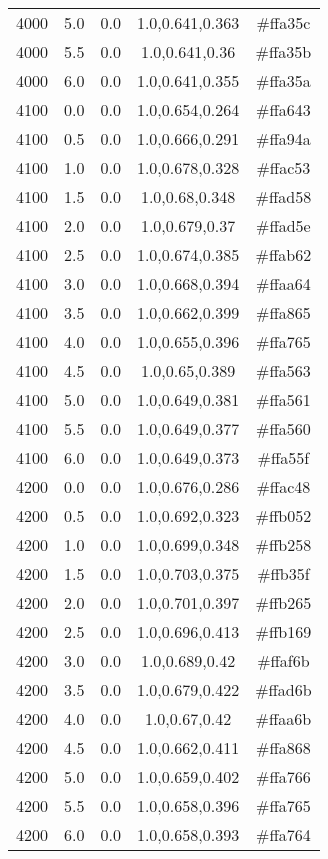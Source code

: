 \begin{tabular}{ccccc}
4000 & 5.0 & 0.0 & 1.0,0.641,0.363 & \#ffa35c \\ 
4000 & 5.5 & 0.0 & 1.0,0.641,0.36 & \#ffa35b \\ 
4000 & 6.0 & 0.0 & 1.0,0.641,0.355 & \#ffa35a \\ 
4100 & 0.0 & 0.0 & 1.0,0.654,0.264 & \#ffa643 \\ 
4100 & 0.5 & 0.0 & 1.0,0.666,0.291 & \#ffa94a \\ 
4100 & 1.0 & 0.0 & 1.0,0.678,0.328 & \#ffac53 \\ 
4100 & 1.5 & 0.0 & 1.0,0.68,0.348 & \#ffad58 \\ 
4100 & 2.0 & 0.0 & 1.0,0.679,0.37 & \#ffad5e \\ 
4100 & 2.5 & 0.0 & 1.0,0.674,0.385 & \#ffab62 \\ 
4100 & 3.0 & 0.0 & 1.0,0.668,0.394 & \#ffaa64 \\ 
4100 & 3.5 & 0.0 & 1.0,0.662,0.399 & \#ffa865 \\ 
4100 & 4.0 & 0.0 & 1.0,0.655,0.396 & \#ffa765 \\ 
4100 & 4.5 & 0.0 & 1.0,0.65,0.389 & \#ffa563 \\ 
4100 & 5.0 & 0.0 & 1.0,0.649,0.381 & \#ffa561 \\ 
4100 & 5.5 & 0.0 & 1.0,0.649,0.377 & \#ffa560 \\ 
4100 & 6.0 & 0.0 & 1.0,0.649,0.373 & \#ffa55f \\ 
4200 & 0.0 & 0.0 & 1.0,0.676,0.286 & \#ffac48 \\ 
4200 & 0.5 & 0.0 & 1.0,0.692,0.323 & \#ffb052 \\ 
4200 & 1.0 & 0.0 & 1.0,0.699,0.348 & \#ffb258 \\ 
4200 & 1.5 & 0.0 & 1.0,0.703,0.375 & \#ffb35f \\ 
4200 & 2.0 & 0.0 & 1.0,0.701,0.397 & \#ffb265 \\ 
4200 & 2.5 & 0.0 & 1.0,0.696,0.413 & \#ffb169 \\ 
4200 & 3.0 & 0.0 & 1.0,0.689,0.42 & \#ffaf6b \\ 
4200 & 3.5 & 0.0 & 1.0,0.679,0.422 & \#ffad6b \\ 
4200 & 4.0 & 0.0 & 1.0,0.67,0.42 & \#ffaa6b \\ 
4200 & 4.5 & 0.0 & 1.0,0.662,0.411 & \#ffa868 \\ 
4200 & 5.0 & 0.0 & 1.0,0.659,0.402 & \#ffa766 \\ 
4200 & 5.5 & 0.0 & 1.0,0.658,0.396 & \#ffa765 \\ 
4200 & 6.0 & 0.0 & 1.0,0.658,0.393 & \#ffa764 \\ 

\end{tabular}
